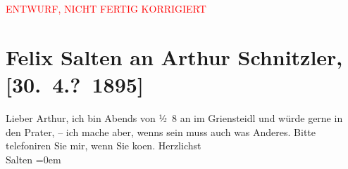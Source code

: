 
\begin{center}
            \textcolor{red}{ENTWURF, NICHT FERTIG KORRIGIERT}
                      \end{center}
            
         \renewcommand{\erwaehnteOrte}{Orte: Café Griensteidl, Prater, Wien}
         \renewcommand{\erwaehnteWerke}{}
               \section[Felix Salten an Arthur Schnitzler, {[}30. 4.? 1895{]}]{ Felix Salten an Arthur Schnitzler, {[}30. 4.? 1895{]}}\nopagebreak{}\rehead{ }\begin{ledgroupsized}[t]{13cm}\normalsize\beginnumbering \toendnotes[C]{\smallbreak\pagebreak[2]} 
\pstart
           \noindent{}{\pb}Lieber Arthur, ich bin Abends von ½ 8 an im Griensteidl und würde gerne in den Prater, – ich mache aber, wenns sein muss auch was Anderes. Bitte
               telefoniren Sie mir, wenn Sie ko{\geminationm}en. \pend
           \pstart
           Herzlichst {\\[\baselineskip]}\spacefill\mbox{Salten}\pend
           \leftskip=0em{}
         
         \endnumbering{}\end{ledgroupsized}\begin{anhang}\end{anhang}\newcommand{\dateiname}{L03154}\newcommand{\titel}{Felix Salten an Arthur Schnitzler, [30. 4.? 1895]}\newcommand{\editorInnen}{Martin Anton Müller und Laura Untner}
      